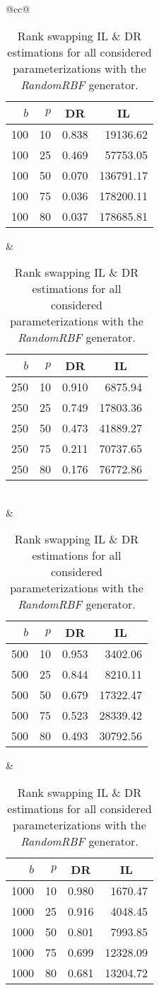 \begin{table}[H]
	\centering
	\begin{tabular}{@{}cc@{}}
		\begin{tabular}{@{}rrrr@{}}
			\toprule
			$b$ & $p$ & \multicolumn{1}{c}{DR} & \multicolumn{1}{c}{IL} \\ \midrule
			100  & 10 & 0.838 & 19136.62  \\
			100  & 25 & 0.469 & 57753.05  \\
			100  & 50 & 0.070 & 136791.17 \\
			100  & 75 & 0.036 & 178200.11 \\
			100  & 80 & 0.037 & 178685.81 \\ \bottomrule
		\end{tabular}
		&
		\begin{tabular}{@{}rrrr@{}}
			\toprule
			$b$ & $p$ & \multicolumn{1}{c}{DR} & \multicolumn{1}{c}{IL} \\ \midrule
			250  & 10 & 0.910 & 6875.94   \\
			250  & 25 & 0.749 & 17803.36  \\
			250  & 50 & 0.473 & 41889.27  \\
			250  & 75 & 0.211 & 70737.65  \\
			250  & 80 & 0.176 & 76772.86  \\ \bottomrule
		\end{tabular}
		\\ & \\
		\begin{tabular}{@{}rrrr@{}}
		\toprule
			$b$ & $p$ & \multicolumn{1}{c}{DR} & \multicolumn{1}{c}{IL} \\ \midrule
			500  & 10 & 0.953 & 3402.06   \\
			500  & 25 & 0.844 & 8210.11   \\
			500  & 50 & 0.679 & 17322.47  \\
			500  & 75 & 0.523 & 28339.42  \\
			500  & 80 & 0.493 & 30792.56  \\ \bottomrule
		\end{tabular}
		&
		\begin{tabular}{@{}rrrr@{}}
			\toprule
			$b$ & $p$ & \multicolumn{1}{c}{DR} & \multicolumn{1}{c}{IL} \\ \midrule
			1000 & 10 & 0.980 & 1670.47   \\
			1000 & 25 & 0.916 & 4048.45   \\
			1000 & 50 & 0.801 & 7993.85   \\
			1000 & 75 & 0.699 & 12328.09  \\
			1000 & 80 & 0.681 & 13204.72  \\ \bottomrule
		\end{tabular}
	\end{tabular}
	\caption[Rank swapping DR \& IL estimations (RandomRBF).]{Rank swapping IL \& DR estimations for all considered parameterizations with the \textit{RandomRBF} generator.}
\end{table}


